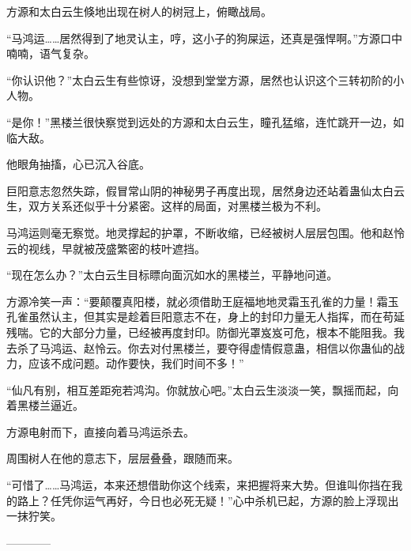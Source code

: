 \begin{this_body}
方源和太白云生倏地出现在树人的树冠上，俯瞰战局。

“马鸿运……居然得到了地灵认主，哼，这小子的狗屎运，还真是强悍啊。”方源口中喃喃，语气复杂。

“你认识他？”太白云生有些惊讶，没想到堂堂方源，居然也认识这个三转初阶的小人物。

“是你！”黑楼兰很快察觉到远处的方源和太白云生，瞳孔猛缩，连忙跳开一边，如临大敌。

他眼角抽搐，心已沉入谷底。

巨阳意志忽然失踪，假冒常山阴的神秘男子再度出现，居然身边还站着蛊仙太白云生，双方关系还似乎十分紧密。这样的局面，对黑楼兰极为不利。

马鸿运则毫无察觉。地灵撑起的护罩，不断收缩，已经被树人层层包围。他和赵怜云的视线，早就被茂盛繁密的枝叶遮挡。

“现在怎么办？”太白云生目标瞟向面沉如水的黑楼兰，平静地问道。

方源冷笑一声：“要颠覆真阳楼，就必须借助王庭福地地灵霜玉孔雀的力量！霜玉孔雀虽然认主，但其实是趁着巨阳意志不在，身上的封印力量无人指挥，而在苟延残喘。它的大部分力量，已经被再度封印。防御光罩岌岌可危，根本不能阻我。我去杀了马鸿运、赵怜云。你去对付黑楼兰，要夺得虚情假意蛊，相信以你蛊仙的战力，应该不成问题。动作要快，我们时间不多！”

“仙凡有别，相互差距宛若鸿沟。你就放心吧。”太白云生淡淡一笑，飘摇而起，向着黑楼兰逼近。

方源电射而下，直接向着马鸿运杀去。

周围树人在他的意志下，层层叠叠，跟随而来。

“可惜了……马鸿运，本来还想借助你这个线索，来把握将来大势。但谁叫你挡在我的路上？任凭你运气再好，今日也必死无疑！”心中杀机已起，方源的脸上浮现出一抹狞笑。

------------

\end{this_body}

